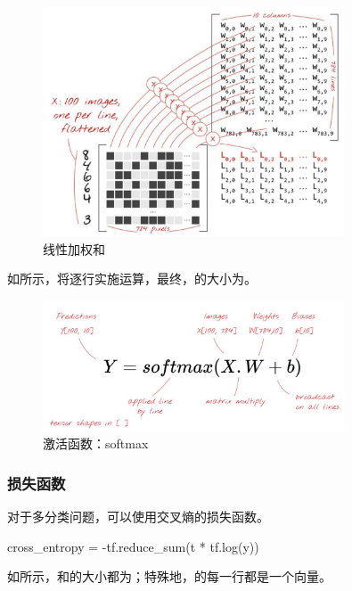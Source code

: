 \begin{content}
\begin{content}
\begin{figure}[H]
\centering
\includegraphics[width=0.8\textwidth]{figures/mnist-linear-sum.png}
\caption{线性加权和}
 \label{fig:mnist-linear-sum}
\end{figure}

如所示，将逐行实施运算，最终，的大小为\code{[100, 10]}。

\begin{figure}[H]
\centering
\includegraphics[width=0.8\textwidth]{figures/mnist-softmax.png}
\caption{激活函数：softmax}
 \label{fig:mnist-softmax}
\end{figure}

\subsubsection{损失函数}

对于多分类问题，可以使用交叉熵的损失函数。

\begin{leftbar}
\begin{python}
cross_entropy = -tf.reduce_sum(t * tf.log(y))
\end{python}
\end{leftbar}

如所示，和的大小都为\code{[100, 10]}；特殊地，的每一行都是一个向量。


\end{content}
\end{content}
